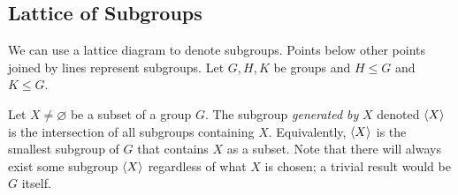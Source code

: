 \subsection{Lattice of Subgroups}
We can use a lattice diagram to denote subgroups. Points below other points joined by lines represent subgroups. Let $G, H, K$ be groups and $H \leq G$ and $K \leq G$.


\begin{definition}
	Let $X \neq \varnothing$ be a subset of a group $G$. The subgroup \textit{generated by} $X$ denoted $\langle X \rangle$ is the intersection of all subgroups containing $X$. Equivalently, $\langle X \rangle$ is the smallest subgroup of $G$ that contains $X$ as a subset. Note that there will always exist some subgroup $\langle X \rangle$ regardless of what $X$ is chosen; a trivial result would be $G$ itself.
\end{definition}
